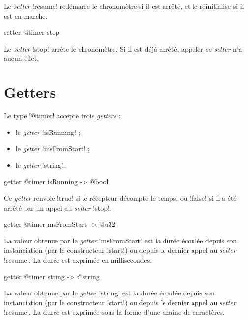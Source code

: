 Le \emph{setter} \ggsq!resume! redémarre le chronomètre si il est arrêté, et le réinitialise si il est en marche.

\begin{galgas4box}
setter @timer stop
\end{galgas4box}

Le \emph{setter} \ggsq!stop! arrête le chronomètre. Si il est déjà arrêté, appeler ce \emph{setter} n'a aucun effet.







\section{Getters}

Le type \ggsq!@timer! accepte trois \emph{getters} :
\begin{itemize}
  \item le \emph{getter} \ggsq!isRunning! ;
  \item le \emph{getter} \ggsq!msFromStart! ;
  \item le \emph{getter} \ggsq!string!.
\end{itemize}


\begin{galgas4box}
getter @timer isRunning -> @bool
\end{galgas4box}

Ce \emph{getter} renvoie  \ggsq!true! si le récepteur décompte le temps, ou \ggsq!false! si il a été arrêté par un appel au \emph{setter} \ggsq!stop!.



\begin{galgas4box}
getter @timer msFromStart -> @u32
\end{galgas4box}

La valeur obtenue par le \emph{getter} \ggsq!msFromStart! est la durée écoulée depuis son instanciation (par le constructeur \ggsq!start!) ou depuis le dernier appel au \emph{setter} \ggsq!resume!. La durée est exprimée en millisecondes.



\begin{galgas4box}
getter @timer string -> @string
\end{galgas4box}

La valeur obtenue par le \emph{getter} \ggsq!string! est la durée écoulée depuis son instanciation (par le constructeur \ggsq!start!) ou depuis le dernier appel au \emph{setter} \ggsq!resume!. La durée est exprimée sous la forme d'une chaîne de caractères.

